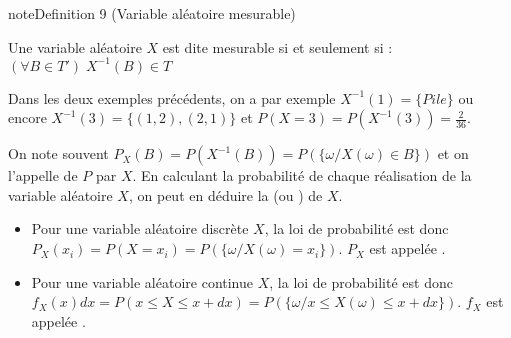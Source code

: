 \documentclass[letterpaper,10pt,french]{sphinxmanual}
\begin{document}
\ignorespaces \label{Rappels:definition-21}
\begin{sphinxadmonition}{note}{Definition 9 (Variable aléatoire mesurable)}



\sphinxAtStartPar
Une variable aléatoire \(X\) est dite mesurable  si et seulement si : \((\forall B\in T')\; X^{-1}(B)\in T\)
\end{sphinxadmonition}

\sphinxAtStartPar
Dans les deux exemples précédents, on a par exemple \(X^{-1}(1)= \{Pile\}\) ou encore \(X^{-1}(3) = \{(1,2),(2,1)\}\) et \(P(X=3)=P(X^{-1}(3)) = \frac{2}{36}\).

\ignorespaces 
{}\ignorespaces 
\sphinxAtStartPar
On note souvent \(P_X(B) = P(X^{-1}(B))=P(\{\omega / X(\omega)\in B\})\) et on l’appelle  de \(P\) par \(X\). En calculant la probabilité de chaque réalisation de la variable aléatoire \(X\), on peut en déduire la  (ou ) de \(X\).
\begin{itemize}
\item {} 
\sphinxAtStartPar
Pour une variable aléatoire discrète \(X\), la loi de probabilité est donc \(P_X(x_i)= P(X=x_i) = P(\{\omega / X(\omega)=x_i\})\). \(P_X\) est appelée .

\end{itemize}

\ignorespaces 
{}\ignorespaces \begin{itemize}
\item {} 
\sphinxAtStartPar
Pour une variable aléatoire continue \(X\), la loi de probabilité est donc \(f_X(x)dx = P(x\leq X\leq x+dx) = P(\{\omega /x\leq X(\omega)\leq x+dx\})\). \(f_X\) est appelée .

\end{itemize}
\end{document}
